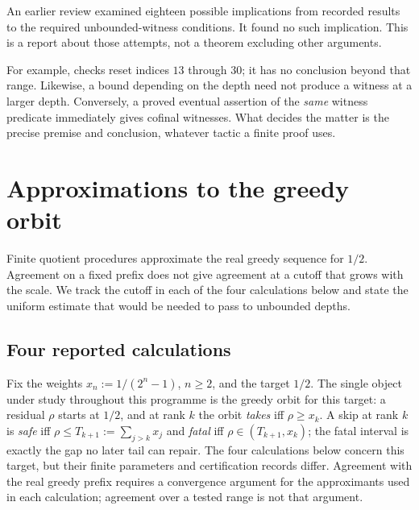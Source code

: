 \begin{rem}
\label{rem:promotion-audit}
An earlier review examined eighteen possible implications from recorded
results to the required unbounded-witness conditions.  It found no
such implication.  This is a report about those attempts, not a theorem
excluding other arguments.

For example, 
checks reset indices $13$ through $30$; it has no conclusion beyond that
range.  Likewise, a bound depending on the depth need not produce a
witness at a larger depth.  Conversely, a proved eventual assertion of
the \emph{same} witness predicate immediately gives cofinal witnesses.
What decides the matter is the precise premise and conclusion, whatever
tactic a finite proof uses.
\end{rem}

\section{Approximations to the greedy orbit}
\label{sec:four-coordinates}
Finite quotient procedures approximate the real greedy sequence for
$1/2$. Agreement on a fixed prefix does not give agreement at a cutoff
that grows with the scale. We track the cutoff in each of the four
calculations below and state the uniform estimate that would be needed
to pass to unbounded depths.


\subsection*{Four reported calculations}

Fix the weights $x_n:=1/(2^n-1)$, $n\ge2$, and the target $1/2$. The single object under study
throughout this programme is the greedy orbit for this target: a residual $\rho$ starts at $1/2$,
and at rank $k$ the orbit \emph{takes} iff $\rho\ge x_k$. A skip at rank $k$ is \emph{safe} iff
$\rho\le T_{k+1}:=\sum_{j>k}x_j$ and \emph{fatal} iff $\rho\in(T_{k+1},x_k)$; the fatal interval is
exactly the gap no later tail can repair. The four calculations below concern this target, but their finite
parameters and certification records differ.  Agreement with the real
greedy prefix requires a convergence argument for the approximants used
in each calculation; agreement over a tested range is not that argument.

